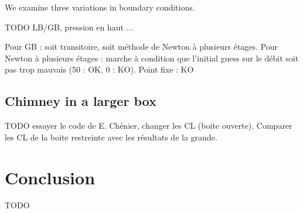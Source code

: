 \documentclass[12pt]{article}
\begin{document}
We examine three variations in boundary conditions.

TODO LB/GB, pression en haut ...

Pour GB : soit transitoire, soit méthode de Newton à plusieurs
étages. Pour Newton à plusieurs étages : marche à condition que
l'initial guess sur le débit soit pas trop mauvais (50 : OK, 0 :
KO). Point fixe : KO

\subsection{Chimney in a larger box}
TODO essayer le code de E. Chénier, changer les CL (boite
ouverte). Comparer les CL de la boite restreinte avec les résultats de
la grande.
\section{Conclusion}
TODO
\listoffigures
\listoftables




\end{document}
